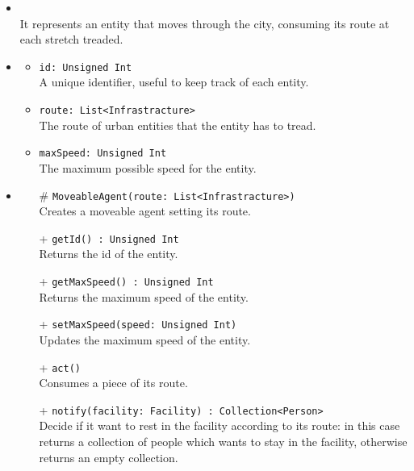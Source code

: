 \begin{itemize}
  \item \textbf{\descr} \\
    It represents an entity that moves through the city, consuming its 
route at each stretch treaded.
  \item \textbf{\attrs}
  \begin{itemize}
    \item \texttt{id: Unsigned Int} \\
A unique identifier, useful to keep track of each entity.
    \item \texttt{route: List<Infrastracture>} \\
The route of urban entities that the entity has to tread.
    \item \texttt{maxSpeed: Unsigned Int} \\
The maximum possible speed for the entity.
  \end{itemize}
  \item \textbf{\ops}
  \begin{itemize}
  \item[\#]  \texttt{MoveableAgent(route: List<Infrastracture>)} \\
Creates a moveable agent setting its route.
    \item[+] \texttt{getId() : Unsigned Int} \\
Returns the id of the entity.
   \item[+] \texttt{getMaxSpeed() : Unsigned Int} \\
Returns the maximum speed of the entity.
    \item[+] \texttt{setMaxSpeed(speed: Unsigned Int)} \\
Updates the maximum speed of the entity.
    \item[+]  \texttt{act()} \\
Consumes a piece of its route.
    \item[+] \texttt{notify(facility: Facility) : Collection<Person>} \\
Decide if it want to rest in the facility according to its route: in this case
returns a collection of people which wants to stay in the facility, otherwise returns
an empty collection.
  \end{itemize}
\end{itemize}
